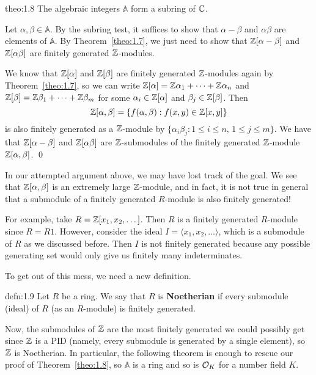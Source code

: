 \begin{theo}{theo:1.8}
    The algebraic integers $\mathbb{A}$ form a subring of $\mathbb{C}$.
\end{theo}
\begin{pf}
    Let $\alpha, \beta \in \mathbb{A}$. By the subring test, it suffices to show that 
    $\alpha - \beta$ and $\alpha\beta$ are elements of $\mathbb{A}$. By 
    Theorem~\ref{theo:1.7}, we just need to show that $\mathbb{Z}[\alpha - \beta]$ 
    and $\mathbb{Z}[\alpha\beta]$ are finitely generated $\mathbb{Z}$-modules. 

    We know that $\mathbb{Z}[\alpha]$ and $\mathbb{Z}[\beta]$ are finitely generated 
    $\mathbb{Z}$-modules again by Theorem~\ref{theo:1.7}, so 
    we can write $\mathbb{Z}[\alpha] = \mathbb{Z}\alpha_1 + \cdots + \mathbb{Z}\alpha_n$ and 
    $\mathbb{Z}[\beta] = \mathbb{Z}\beta_1 + \cdots + \mathbb{Z}\beta_m$ for some 
    $\alpha_i \in \mathbb{Z}[\alpha]$ and $\beta_j \in \mathbb{Z}[\beta]$. Then 
    \[ \mathbb{Z}[\alpha, \beta] = \{f(\alpha, \beta) : f(x, y) \in \mathbb{Z}[x, y]\} \] 
    is also finitely generated as a $\mathbb{Z}$-module by 
    $\{\alpha_i \beta_j : 1 \leq i \leq n,\, 1 \leq j \leq m\}$. We have 
    that $\mathbb{Z}[\alpha-\beta]$ and $\mathbb{Z}[\alpha\beta]$ are $\mathbb{Z}$-submodules of 
    the finitely generated $\mathbb{Z}$-module $\mathbb{Z}[\alpha, \beta]$. \qed
\end{pf}

In our attempted argument above, we may have lost track of the goal. 
We see that $\mathbb{Z}[\alpha, \beta]$ is an extremely large $\mathbb{Z}$-module, and in 
fact, it is not true in general that a submodule of a finitely generated 
$R$-module is also finitely generated!

For example, take $R = \mathbb{Z}[x_1, x_2, \dots]$. Then $R$ is a finitely generated 
$R$-module since $R = R1$. However, consider the ideal $I = 
\langle x_1, x_2, \dots \rangle$, which is a submodule of $R$ as we 
discussed before. Then $I$ is not finitely generated because any 
possible generating set would only give us finitely many indeterminates. 

To get out of this mess, we need a new definition. 

\begin{defn}{defn:1.9}
    Let $R$ be a ring. We say that $R$ is {\bf Noetherian} if every 
    submodule (ideal) of $R$ (as an $R$-module) is finitely generated. 
\end{defn}

Now, the submodules of $\mathbb{Z}$ are the most finitely generated we could 
possibly get since $\mathbb{Z}$ is a PID (namely, every submodule is 
generated by a single element), so $\mathbb{Z}$ is Noetherian. In particular, the 
following theorem is enough to rescue our proof of Theorem~\ref{theo:1.8},
so $\mathbb{A}$ is a ring and so is ${\cal O}_K$ for a number field $K$. 

